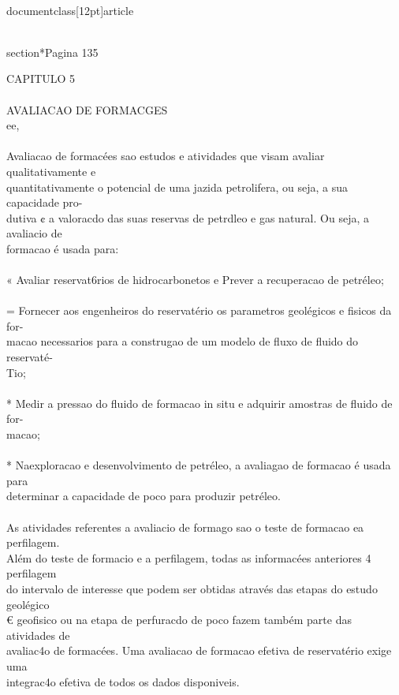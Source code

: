 \\documentclass[12pt]{article}
\begin{document}
\\section*{Pagina 135}

CAPITULO 5\\
\\
AVALIACAO DE FORMACGES\\
ee,\\
\\
Avaliacao de formacées sao estudos e atividades que visam avaliar qualitativamente e\\
quantitativamente o potencial de uma jazida petrolifera, ou seja, a sua capacidade pro-\\
dutiva ¢ a valoracdo das suas reservas de petrdleo e gas natural. Ou seja, a avaliacio de\\
formacao é usada para:\\
\\
« Avaliar reservat6rios de hidrocarbonetos e Prever a recuperacao de petréleo;\\
\\
= Fornecer aos engenheiros do reservatério os parametros geolégicos e fisicos da for-\\
macao necessarios para a construgao de um modelo de fluxo de fluido do reservaté-\\
Tio;\\
\\
* Medir a pressao do fluido de formacao in situ e adquirir amostras de fluido de for-\\
macao;\\
\\
* Naexploracao e desenvolvimento de petréleo, a avaliagao de formacao é usada para\\
determinar a capacidade de poco para produzir petréleo.\\
\\
As atividades referentes a avaliacio de formago sao o teste de formacao ea perfilagem.\\
Além do teste de formacio e a perfilagem, todas as informacées anteriores 4 perfilagem\\
do intervalo de interesse que podem ser obtidas através das etapas do estudo geolégico\\
€ geofisico ou na etapa de perfuracdo de poco fazem também parte das atividades de\\
avaliac4o de formacées. Uma avaliacao de formacao efetiva de reservatério exige uma\\
integrac4o efetiva de todos os dados disponiveis.\\
\\
\end{document}
